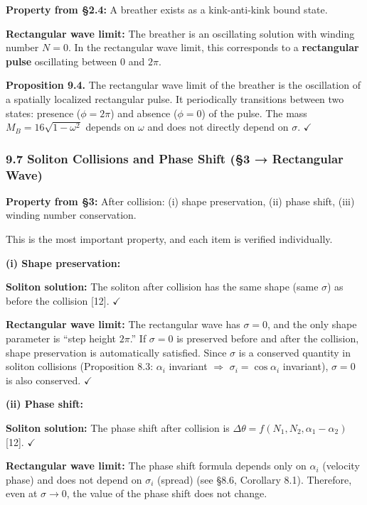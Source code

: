\documentclass[a4paper,11pt]{article}
\begin{document}
\textbf{Property from §2.4:} A breather exists as a kink-anti-kink bound
state.

\textbf{Rectangular wave limit:} The breather is an oscillating solution
with winding number \(N = 0\). In the rectangular wave limit, this
corresponds to a \textbf{rectangular pulse} oscillating between \(0\)
and \(2\pi\).

\textbf{Proposition 9.4.} The rectangular wave limit of the breather is
the oscillation of a spatially localized rectangular pulse. It
periodically transitions between two states: presence (\(\phi = 2\pi\))
and absence (\(\phi = 0\)) of the pulse. The mass
\(M_B = 16\sqrt{1-\omega^2}\) depends on \(\omega\) and does not
directly depend on \(\sigma\). \(\checkmark\)

\subsubsection{9.7 Soliton Collisions and Phase Shift (§3 → Rectangular
Wave)}\label{soliton-collisions-and-phase-shift-3-rectangular-wave}

\textbf{Property from §3:} After collision: (i) shape preservation, (ii)
phase shift, (iii) winding number conservation.

This is the most important property, and each item is verified
individually.

\textbf{(i) Shape preservation:}

\textbf{Soliton solution:} The soliton after collision has the same
shape (same \(\sigma\)) as before the collision {[}12{]}. \(\checkmark\)

\textbf{Rectangular wave limit:} The rectangular wave has
\(\sigma = 0\), and the only shape parameter is ``step height
\(2\pi\).'' If \(\sigma = 0\) is preserved before and after the
collision, shape preservation is automatically satisfied. Since
\(\sigma\) is a conserved quantity in soliton collisions (Proposition
8.3: \(\alpha_i\) invariant \(\Rightarrow\) \(\sigma_i = \cos\alpha_i\)
invariant), \(\sigma = 0\) is also conserved. \(\checkmark\)

\textbf{(ii) Phase shift:}

\textbf{Soliton solution:} The phase shift after collision is
\(\Delta\theta = f(N_1, N_2, \alpha_1 - \alpha_2)\) {[}12{]}.
\(\checkmark\)

\textbf{Rectangular wave limit:} The phase shift formula depends only on
\(\alpha_i\) (velocity phase) and does not depend on \(\sigma_i\)
(spread) (see §8.6, Corollary 8.1). Therefore, even at \(\sigma \to 0\),
the value of the phase shift does not change.
\end{document}
